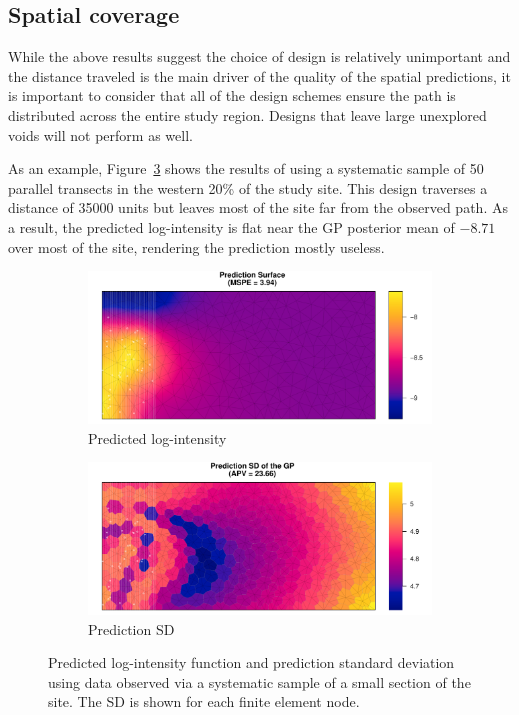 \documentclass[review]{elsarticle}
\begin{document}
\subsection{Spatial coverage}

While the above results suggest the choice of design is relatively unimportant
and the distance traveled is the main driver of the quality of the spatial
predictions, it is important to consider that all of the design schemes ensure
the path is distributed across the entire study region. Designs that leave
large unexplored voids will not perform as well.

As an example, Figure~\ref{badxsect} shows the results of using a systematic
sample of 50 parallel transects in the western 20\% of the study site. This
design traverses a distance of 35000 units but leaves most of the site far from
the observed path. As a result, the predicted log-intensity is flat near the
GP posterior mean of \(-8.71\) over most of the site, rendering the prediction
mostly useless.

\begin{figure}

\begin{subfigure}{5in}
\includegraphics[width=5in]{../graphics/lambda-BadXsect-LGCP000004.pdf}
\caption{Predicted log-intensity}
\label{lambdabad}
\end{subfigure}

\begin{subfigure}{5in}
\includegraphics[width=5in]{../graphics/lambdaSD-BadXsect-LGCP000004.pdf}
\caption{Prediction SD}
\label{sdbad}
\end{subfigure}

\caption{Predicted log-intensity function and prediction standard deviation
using data observed via a systematic sample of a small section of the site. The
SD is shown for each finite element node.}
\label{badxsect}
\end{figure}
\end{document}

